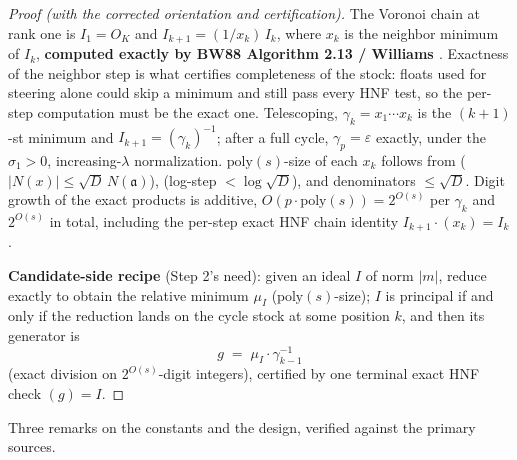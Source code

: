 \documentclass[11pt]{amsart}
\theoremstyle{plain}
\theoremstyle{remark}
\begin{document}
\begin{proof}[Proof (with the corrected orientation and
certification)]
The Voronoi chain at rank one is $I_1 = O_K$ and
$I_{k+1} = (1/x_k)\,I_k$, where $x_k$ is the neighbor minimum of
$I_k$, \textbf{computed exactly by BW88 Algorithm 2.13 / Williams
\cite{Wil85}}. Exactness of the neighbor step is what certifies
completeness of the stock: floats used for steering alone could skip
a minimum and still pass every HNF test, so the per-step computation
must be the exact one. Telescoping, $\gamma_k = x_1\cdots x_k$ is the
$(k{+}1)$-st minimum and $I_{k+1} = (\gamma_k)^{-1}$; after a full
cycle, $\gamma_p = \varepsilon$ exactly, under the $\sigma_1 > 0$,
increasing-$\lambda$ normalization. $\mathrm{poly}(s)$-size of each
$x_k$ follows from \cite[Prop.~2.4]{BW88}
($|N(x)| \le \sqrt{D}\,N(\mathfrak{a})$), \cite[Prop.~2.7(i)]{BW88}
(log-step $< \log\sqrt{D}$), and denominators $\le \sqrt{D}$. Digit
growth of the exact products is additive,
$O(p\cdot\mathrm{poly}(s)) = 2^{O(s)}$ per $\gamma_k$ and $2^{O(s)}$
in total, including the per-step exact HNF chain identity
$I_{k+1}\cdot(x_k) = I_k$.

\textbf{Candidate-side recipe} (Step 2's need): given an ideal $I$ of
norm $|m|$, reduce exactly to obtain the relative minimum $\mu_I$
($\mathrm{poly}(s)$-size); $I$ is principal if and only if the
reduction lands on the cycle stock at some position $k$, and then its
generator is
\[
g \;=\; \mu_I\cdot\gamma_{k-1}^{-1}
\]
(exact division on $2^{O(s)}$-digit integers), certified by one
terminal exact HNF check $(g) = I$.
\end{proof}

Three remarks on the constants and the design, verified against the
primary sources.
\end{document}
